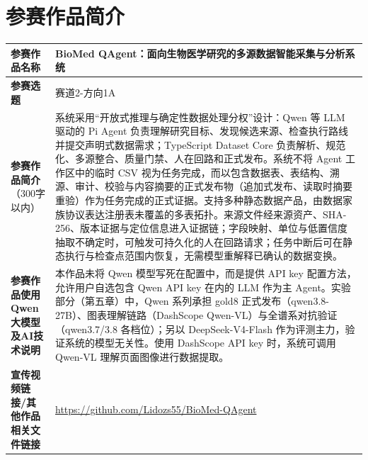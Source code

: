 \chapter*{参赛作品简介}

{\renewcommand{\arraystretch}{1.6}%
\begin{tabular}{|>{\centering\arraybackslash}m{}|m{}|}
\hline
\textbf{参赛作品名称} & BioMed QAgent：面向生物医学研究的多源数据智能采集与分析系统 \\ \hline
\textbf{参赛选题} & 赛道2-方向1A \\ \hline
\textbf{参赛作品简介}（300字以内） & 系统采用“开放式推理与确定性数据处理分权”设计：Qwen 等 LLM 驱动的 Pi Agent 负责理解研究目标、发现候选来源、检查执行路线并提交声明式数据需求；TypeScript Dataset Core 负责解析、规范化、多源整合、质量门禁、人在回路和正式发布。系统不将 Agent 工作区中的临时 CSV 视为任务完成，而以包含数据表、表结构、溯源、审计、校验与内容摘要的正式发布物（追加式发布、读取时摘要重验）作为任务完成的正式证据。支持多种静态数据产品，由数据家族协议表达注册表未覆盖的多表拓扑。来源文件经来源资产、SHA-256、版本证据与定位信息进入证据链；字段映射、单位与低置信度抽取不确定时，可触发可持久化的人在回路请求；任务中断后可在静态执行与检查点范围内恢复，无需模型重解释已确认的数据变换。 \\ \hline
\textbf{参赛作品使用Qwen大模型及AI技术说明} & 本作品未将 Qwen 模型写死在配置中，而是提供 API key 配置方法，允许用户自选包含 Qwen API key 在内的 LLM 作为主 Agent。实验部分（第五章）中，Qwen 系列承担 gold8 正式发布（qwen3.8-27B）、图表理解链路（DashScope Qwen-VL）与全谱系对抗验证（qwen3.7/3.8 各档位）；另以 DeepSeek-V4-Flash 作为评测主力，验证系统的模型无关性。使用 DashScope API key 时，系统可调用 Qwen-VL 理解页面图像进行数据提取。 \\ \hline
\textbf{宣传视频链接/其他作品相关文件链接} & \url{https://github.com/Lidozs55/BioMed-QAgent} \\ \hline
\end{tabular}}
